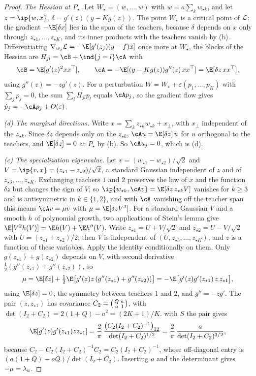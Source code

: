 \begin{refsection}
\begin{proof}
\emph{The Hessian at $P_\star$.} Let $W_\star=(w,\dots,w)$ with $w=a\sum_kw_{\star k}$, and let $z=\ip{w,x}$, $\delta=g'(z)(y-Kg(z))$. The point $W_\star$ is a critical point of $\mathcal{L}$: the gradient $-\E[\delta x]$ lies in the span of the teachers, because $\delta$ depends on $x$ only through $z_{\star1},\dots,z_{\star K}$, and its inner products with the teachers vanish by (b). Differentiating $\nabla_{w_j}\Loss=-\E[g'(z_j)(y-f)x]$ once more at $W_\star$, the blocks of the Hessian are $H_{jl}=\cB+\ind\{j=l\}\cA$ with
\[
  \cB=\E[g'(z)^2xx^\top],\qquad \cA=-\E[(y-Kg(z))g''(z)\,xx^\top]=\E[\delta z\,xx^\top],
\]
using $g''(z)=-zg'(z)$. For a perturbation $W=W_\star+\varepsilon(p_1,\dots,p_K)$ with $\sum_jp_j=0$, the sum $\sum_lH_{jl}p_l$ equals $\cA p_j$, so the gradient flow gives $\dot p_j=-\cA p_j+O(\varepsilon)$.

\emph{(d) The marginal directions.} Write $x=\sum_kz_{\star k}w_{\star k}+x_\perp$, with $x_\perp$ independent of the $z_{\star k}$. Since $\delta z$ depends only on the $z_{\star k}$, $\cA u=\E[\delta z]\,u$ for $u$ orthogonal to the teachers, and $\E[\delta z]=0$ at $P_\star$ by (b). So $\cA u_j=0$, which is (d).

\emph{(c) The specialization eigenvalue.} Let $v=(w_{\star1}-w_{\star2})/\sqrt2$ and $V=\ip{v,x}=(z_{\star1}-z_{\star2})/\sqrt2$, a standard Gaussian independent of $z$ and of $z_{\star3},\dots,z_{\star K}$. Exchanging teachers $1$ and $2$ preserves the law of $x$ and the function $\delta z$ but changes the sign of $V$; so $\ip{w_{\star k},\cA v}=\E[\delta z\,z_{\star k}V]$ vanishes for $k\ge3$ and is antisymmetric in $k\in\{1,2\}$, and with $\cA$ vanishing off the teacher span this means $\cA v=\mu v$ with $\mu=\E[\delta zV^2]$. For a standard Gaussian $V$ and a smooth $h$ of polynomial growth, two applications of Stein's lemma give $\E[V^2h(V)]=\E h(V)+\E h''(V)$. Write $z_{\star1}=U+V/\sqrt2$ and $z_{\star2}=U-V/\sqrt2$ with $U=(z_{\star1}+z_{\star2})/2$; then $V$ is independent of $(U,z_{\star3},\dots,z_{\star K})$, and $z$ is a function of these variables. Apply the identity conditionally on them. Only $g(z_{\star1})+g(z_{\star2})$ depends on $V$, with second derivative $\frac12(g''(z_{\star1})+g''(z_{\star2}))$, so
\[
  \mu=\E[\delta z]+\tfrac12\E\bigl[g'(z)z\,(g''(z_{\star1})+g''(z_{\star2}))\bigr]=-\E\bigl[g'(z)g'(z_{\star1})\,z\,z_{\star1}\bigr],
\]
using $\E[\delta z]=0$, the symmetry between teachers $1$ and $2$, and $g''=-zg'$. The pair $(z,z_{\star1})$ has covariance $C_2=\begin{psmallmatrix}Q&a\\a&1\end{psmallmatrix}$, with $\det(I_2+C_2)=2(1+Q)-a^2=(2K+1)/K$.  with $S$ the pair gives
\[
  \E[g'(z)g'(z_{\star1})zz_{\star1}]=\frac{2}{\pi}\,\frac{\bigl(C_2(I_2+C_2)^{-1}\bigr)_{12}}{\det(I_2+C_2)^{1/2}}=\frac2\pi\,\frac{a}{\det(I_2+C_2)^{3/2}},
\]
because $C_2-C_2(I_2+C_2)^{-1}C_2=C_2(I_2+C_2)^{-1}$, whose off-diagonal entry is $(a(1+Q)-aQ)/\det(I_2+C_2)$. Inserting $a$ and the determinant gives $-\mu=\lambda_{\mathrm u}$.


\end{proof}
\end{refsection}

